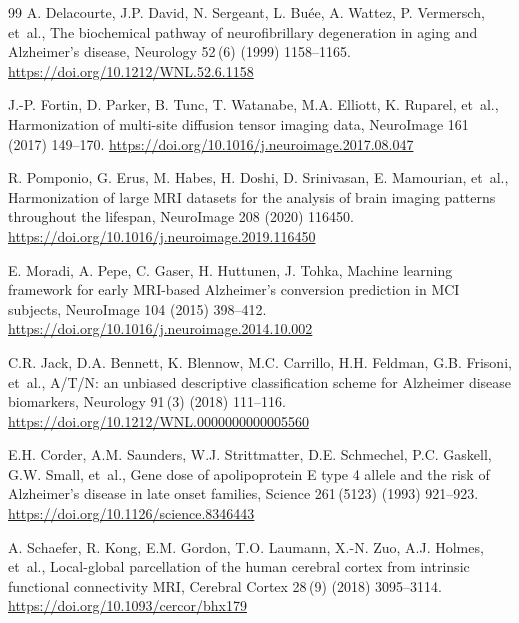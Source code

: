 \documentclass[12pt,a4paper]{article}
\begin{document}
\begin{thebibliography}{99}
A. Delacourte, J.P. David, N. Sergeant, L. Bu\'{e}e, A. Wattez, P. Vermersch, et~al., The biochemical pathway of neurofibrillary degeneration in aging and Alzheimer's disease, Neurology 52\,(6) (1999) 1158--1165.
\url{https://doi.org/10.1212/WNL.52.6.1158}

J.-P. Fortin, D. Parker, B. Tunc, T. Watanabe, M.A. Elliott, K. Ruparel, et~al., Harmonization of multi-site diffusion tensor imaging data, NeuroImage 161 (2017) 149--170.
\url{https://doi.org/10.1016/j.neuroimage.2017.08.047}

R. Pomponio, G. Erus, M. Habes, H. Doshi, D. Srinivasan, E. Mamourian, et~al., Harmonization of large MRI datasets for the analysis of brain imaging patterns throughout the lifespan, NeuroImage 208 (2020) 116450.
\url{https://doi.org/10.1016/j.neuroimage.2019.116450}

E. Moradi, A. Pepe, C. Gaser, H. Huttunen, J. Tohka, Machine learning framework for early MRI-based Alzheimer's conversion prediction in MCI subjects, NeuroImage 104 (2015) 398--412.
\url{https://doi.org/10.1016/j.neuroimage.2014.10.002}

C.R. Jack, D.A. Bennett, K. Blennow, M.C. Carrillo, H.H. Feldman, G.B. Frisoni, et~al., A/T/N: an unbiased descriptive classification scheme for Alzheimer disease biomarkers, Neurology 91\,(3) (2018) 111--116.
\url{https://doi.org/10.1212/WNL.0000000000005560}

E.H. Corder, A.M. Saunders, W.J. Strittmatter, D.E. Schmechel, P.C. Gaskell, G.W. Small, et~al., Gene dose of apolipoprotein E type 4 allele and the risk of Alzheimer's disease in late onset families, Science 261\,(5123) (1993) 921--923.
\url{https://doi.org/10.1126/science.8346443}

A. Schaefer, R. Kong, E.M. Gordon, T.O. Laumann, X.-N. Zuo, A.J. Holmes, et~al., Local-global parcellation of the human cerebral cortex from intrinsic functional connectivity MRI, Cerebral Cortex 28\,(9) (2018) 3095--3114.
\url{https://doi.org/10.1093/cercor/bhx179}

\end{thebibliography}
\end{document}
